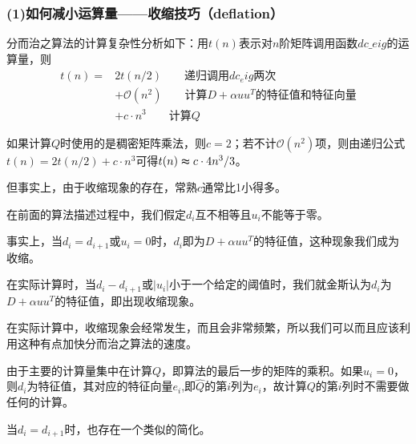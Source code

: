\documentclass[notheorems,serif]{beamer}
\begin{document}
\begin{frame}
\frametitle{(1)如何减小运算量——收缩技巧（deflation）}

分而治之算法的计算复杂性分析如下：用$t(n)$表示对$n$阶矩阵调用函数$dc\_eig$的运算量，则
\begin{equation*}
	\begin{aligned}
		t(n)=&2t(n/2)\qquad \mbox{递归调用}dc_eig\mbox{两次}\\&+\mathcal{O}(n^2)\qquad  \mbox{计算}D+\alpha uu^T \mbox{的特征值和特征向量}\\&+c\cdot n^3 \qquad \mbox{计算}Q
	\end{aligned}
\end{equation*}

如果计算$Q$时使用的是稠密矩阵乘法，则$c=2$；若不计$\mathcal{O} (n^2)$项，则由递归公式$t(n)=2t(n/2)+c\cdot n^3$可得$t(n)\thickapprox c\cdot 4n^3/3$。

但事实上，由于收缩现象的存在，常熟$c$通常比1小得多。
\end{frame}
\begin{frame}
在前面的算法描述过程中，我们假定$d_i$互不相等且$u_i$不能等于零。

事实上，当$d_i=d_{i+1}$或$u_i=0$时，$d_i$即为$D+\alpha uu^T$的特征值，这种现象我们成为收缩。

在实际计算时，当$d_i-d_{i+1}$或$|u_i|$小于一个给定的阈值时，我们就金斯认为$d_i$为$D+\alpha uu^T$的特征值，即出现收缩现象。

在实际计算中，收缩现象会经常发生，而且会非常频繁，所以我们可以而且应该利用这种有点加快分而治之算法的速度。

由于主要的计算量集中在计算$Q$，即算法的最后一步的矩阵的乘积。如果$u_i=0$，则$d_i$为特征值，其对应的特征向量$e_i$,即$\hat{Q}$的第$i$列为$e_i$，故计算$Q$的第$i$列时不需要做任何的计算。

当$d_i=d_{i+1}$时，也存在一个类似的简化。\\
\end{frame}
\end{document}
